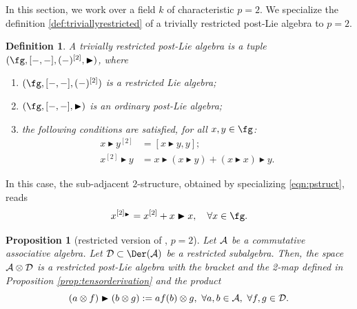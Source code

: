 \documentclass[12pt]{article}
\newcommand {\A}{{\cal{A}}}
\newcommand{\D}{{\cal{D}}}
\newcommand{\btr}{\blacktriangleright}
\newtheorem{proposition}[theorem]{Proposition}
\newtheorem{definition}[theorem]{Definition}
\begin{document}
In this section, we work over a field $k$ of characteristic $p=2$.
We specialize the definition \ref{def:triviallyrestricted} of a trivially restricted post-Lie algebra to $p=2$.
\begin{definition}\label{def:restrictedpostlie2}
A trivially restricted post-Lie algebra is a tuple $(\fg,[-,-],(-)^{[2]},\btr)$, where
\begin{enumerate}
    \item $(\fg,[-,-],(-)^{[2]})$ is a restricted Lie algebra;
    \item $(\fg,[-,-],\btr)$ is an ordinary post-Lie algebra;
    \item the following conditions are satisfied, for all $x,y\in \fg$:
    \begin{align}
        x\btr y^{[2]}&=[x\btr y,y];\label{eq:restderivation2}\\
        x^{[2]}\btr y&=x\btr(x\btr y)+(x\btr x)\btr y.\label{eq:associator2}
    \end{align}
\end{enumerate}
\end{definition}
In this case, the sub-adjacent $2$-structure, obtained by specializing \eqref{eqn:pstruct}, reads
\begin{equation}
x^{[2]_{\btr}}=x^{[2]}+ x\btr x, \quad \forall x\in \fg.
\end{equation}
\begin{proposition}[restricted version of , $p=2$]\label{prop:JZp=2}
      Let $\A$ be a commutative associative algebra. Let $\D\subset\Der(\A)$ be a restricted subalgebra. Then, the space $\A\otimes\D$ is a restricted post-Lie algebra with the bracket and the 2-map defined in Proposition \ref{prop:tensorderivation} and the product
      \begin{equation}
        (a\otimes f)\btr(b\otimes g):=af(b)\otimes g,~\forall a,b\in \A,~\forall f,g\in \D.     
        \end{equation}
      \end{proposition}
\end{document}
